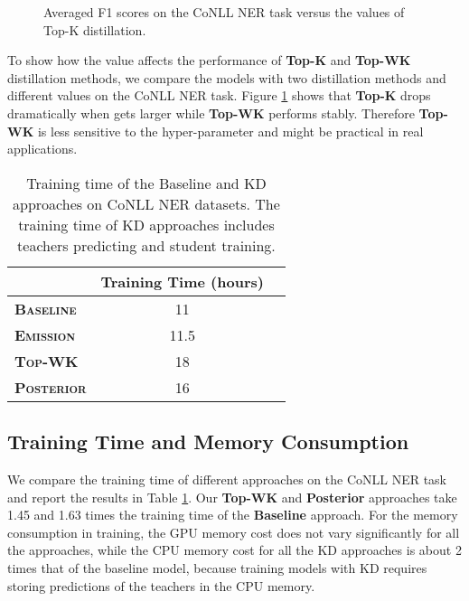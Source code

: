 \documentclass[11pt,a4paper]{article}
\begin{document}
\begin{figure}[t]
\centering
{}
\caption{Averaged F1 scores on the CoNLL NER task versus the  values of Top-K distillation. }
\label{fig:kbest}
\end{figure}

To show how the  value affects the performance of \textbf{Top-K} and \textbf{Top-WK} distillation methods, we compare the models with two distillation methods and different  values on the CoNLL NER task. Figure \ref{fig:kbest} shows that \textbf{Top-K} drops dramatically when  gets larger while \textbf{Top-WK} performs stably. Therefore \textbf{Top-WK} is less sensitive to the hyper-parameter  and might be practical in real applications.



\begin{table}[t]
\centering
\small
\begin{tabular}{l|cc}
\hline\hline
& \textbf{Training Time (hours)}\\
\hline
{\bf\textsc{Baseline}} & 11  \\
{\bf\textsc{Emission}} & 11.5  \\
{\bf\textsc{Top-WK}} & 18  \\
{\bf\textsc{Posterior}} & 16 \\
\hline\hline
\end{tabular}
\caption{Training time of the Baseline and KD approaches on CoNLL NER datasets. The training time of KD approaches includes teachers predicting and student training.}
\label{tab:time-consumption}
\end{table}


\subsection{Training Time and Memory Consumption}
We compare the training time of different approaches on the CoNLL NER task and report the results in Table \ref{tab:time-consumption}. Our \textbf{Top-WK} and \textbf{Posterior} approaches take 1.45 and 1.63 times the training time of the \textbf{Baseline} approach. For the memory consumption in training, the GPU memory cost does not vary significantly for all the approaches, while the CPU memory cost for all the KD approaches is about 2 times that of the baseline model, because training models with KD requires storing predictions of the teachers in the CPU memory.
\end{document}
